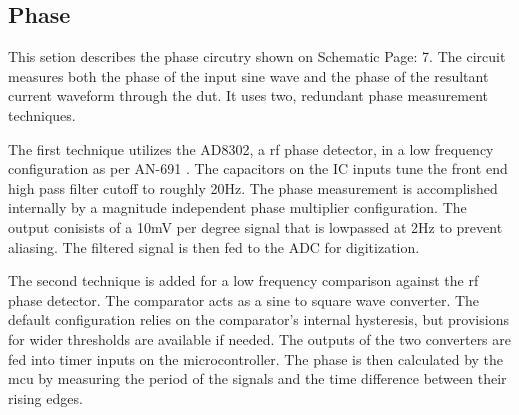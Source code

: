 \subsection{Phase}

This setion describes the phase circutry shown on Schematic Page: 7. The circuit measures both the phase of the input sine wave and the phase of the resultant current waveform through the \gls{dut}. It uses two, redundant phase measurement techniques.

The first technique utilizes the AD8302, a \gls{rf} phase detector, in a low frequency configuration as per AN-691 \cite{AD8302_AppNote}. The capacitors on the IC inputs tune the front end high pass filter cutoff to roughly 20Hz. The phase measurement is accomplished internally by a magnitude independent phase multiplier configuration. The output conisists of a 10mV per degree signal that is lowpassed at 2Hz to prevent aliasing. The filtered signal is then fed to the ADC for digitization.

The second technique is added for a low frequency comparison against the \gls{rf} phase detector. The comparator acts as a sine to square wave converter. The default configuration relies on the comparator's internal hysteresis, but provisions for wider thresholds are available if needed. The outputs of the two converters are fed into timer inputs on the microcontroller. The phase is then calculated by the \gls{mcu} by measuring the period of the signals and the time difference between their rising edges.

